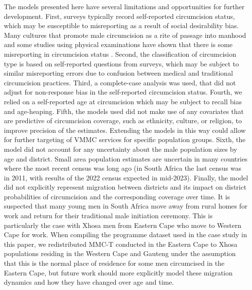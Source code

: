 \documentclass{article}
\begin{document}
The models presented here have several limitations and opportunities for further development. First, surveys typically record self-reported circumcision status, which may be susceptible to misreporting as a result of social desirability bias. Many cultures that promote male circumcision as a rite of passage into manhood and some studies using physical examinations have shown that there is some misreporting in circumcision status \cite{lagarde2003acceptability, lissouba2011adult}. Second, the classification of circumcision type is based on self-reported questions from surveys, which may be subject to similar misreporting errors due to confusion between medical and traditional circumcision practices. Third, a complete-case analysis was used, that did not adjust for non-response bias in the self-reported circumcision status. Fourth, we relied on a self-reported age at circumcision which may be subject to recall bias and age-heaping. Fifth, the models used did not make use of any covariates that are predictive of circumcision coverage, such as ethnicity, culture, or religion, to improve precision of the estimates. Extending the models in this way could allow for further targeting of VMMC services for specific population groups. Sixth, the model did not account for any uncertainty about the male population sizes by age and district. Small area population estimates are uncertain in many countries where the most recent census was long ago (in South Africa the last census was in 2011, with results of the 2022 census expected in mid-2023). Finally, the model did not explicitly represent migration between districts and its impact on district probabilities of circumcision and the corresponding coverage over time. It is suspected that many young men in South Africa move away from rural homes for work and return for their traditional male initiation ceremony. This is particularly the case with Xhosa men from Eastern Cape who move to Western Cape for work. When compiling the programme dataset used in the case study in this paper, we redistributed MMC-T conducted in the Eastern Cape to Xhosa populations residing in the Western Cape and Gauteng under the assumption that this is the normal place of residence for some men circumcised in the Eastern Cape, but future work should more explicitly model these migration dynamics and how they have changed over age and time.
\end{document}
